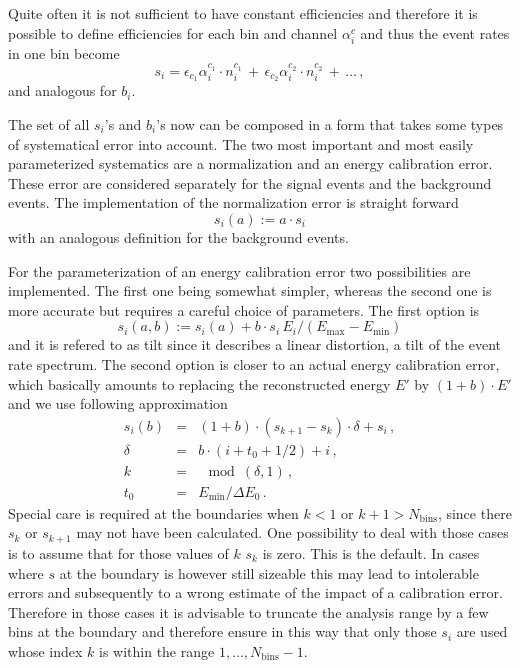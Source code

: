 Quite often it is not sufficient to have constant efficiencies and therefore
it is possible to define efficiencies for each bin and channel $\alpha_i^c$
and thus the event rates in one bin become
\begin{equation}
s_i=\epsilon_{c_1}\alpha_i^{c_1}\cdot n_i^{c_1}\,+
\,\epsilon_{c_2}\alpha_i^{c_2}\cdot n_i^{c_2}\,+\,\ldots\,,
\end{equation}
and analogous for $b_i$.



The set of all $s_i$'s and $b_i$'s now can be composed in a form that takes
some types of systematical error into account. The two most important and
most easily parameterized systematics are a normalization and an energy
calibration error. These error are considered separately for the signal events
and the background events. The implementation of the normalization error
is straight forward
\begin{equation}
s_i(a):=a\cdot s_i
\end{equation} 
with an analogous definition for the background events.

For the parameterization of an energy calibration error two possibilities
are implemented. The first one being somewhat simpler, whereas the second one
is more accurate but requires a careful choice of parameters. The first 
option is
\begin{equation}
s_i(a,b):=s_i(a)+b\cdot s_i\, E_i/(E_\mathrm{max}-E_\mathrm{min})
\end{equation}
and it is refered to as tilt since it describes a linear distortion, a tilt
of the event rate spectrum. The second option is closer to an actual energy
calibration error, which basically amounts to replacing the reconstructed 
energy $E'$ by $(1+b)\cdot E'$ and we use following approximation
\begin{eqnarray}
s_i(b)&=& (1+b)\cdot(s_{k+1}-s_k)\cdot\delta+s_i\,,\\
\delta&=&b\cdot(i+t_0+ 1/2)+i\,,\nonumber\\
k&=&\mod(\delta,1)\,,\nonumber\\
t_0&=&E_\mathrm{min}/\Delta E_0\,.\nonumber
\end{eqnarray}
Special care is required at the boundaries when $k<1$ or $k+1>N_\mathrm{bins}$,
since there $s_k$ or $s_{k+1}$ may not have been calculated. One possibility
to deal with those cases is to assume that for those values of $k$ $s_k$ is
zero. This is the default. In cases where $s$ at the boundary is however still
sizeable this may lead to intolerable errors and subsequently to a wrong
estimate of the impact of a calibration error. Therefore in those cases it
is advisable to truncate the analysis range by a few bins at the boundary
and therefore ensure in this way that only those $s_i$ are used whose index
$k$ is within the range $1,\ldots, N_\mathrm{bins}-1$. 

